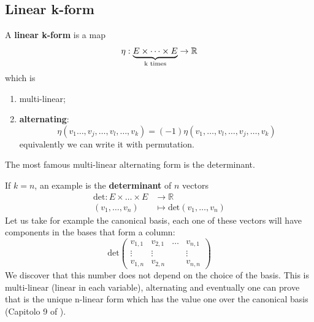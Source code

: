 \documentclass[../main.tex]{subfiles}
\begin{document}
\subsection{Linear k-form}
\begin{definition}
A \textbf{linear k-form} is a map
\[
\eta : \underbrace{E\times\dots\times E}_{\textrm{k times}} \to  \mathbb{R}\\
\]
which is
\begin{enumerate}
    \item multi-linear;
    \item \textbf{alternating}:
    \[
    \eta\left(v_1\dots,{v_j},\dots,{v_l},\dots,v_k\right)=(-1)\eta\left(v_1,\dots,{v_l},\dots,{v_j},\dots,v_k\right)
    \]
    equivalently we can write it with permutation.
\end{enumerate}
\end{definition}
The most famous multi-linear alternating form is the determinant.
\begin{example}
If $k=n$, an example is the \textbf{determinant} of $n$ vectors
\[
\begin{split}
\textrm{det} : E\times\dots\times E& \to  \mathbb{R}\\
(v_1,\dots,v_n) &\mapsto \textrm{det}(v_1,\dots,v_n)
\end{split}
\]
Let us take for example the canonical basis, each one of these vectors will have components in the bases that form a column:
\[
\textrm{det}
\begin{pmatrix}
v_{1,1} & v_{2,1} & \dots & v_{n,1}\\
\vdots & \vdots & & \vdots\\
v_{1,n} & v_{2,n} & & v_{n,n}
\end{pmatrix}
\]
We discover that this number does not depend on the choice of the basis. This is multi-linear (linear in each variable), alternating and eventually one can prove that is the unique n-linear form which has the value one over the canonical basis (Capitolo 9 of ).
\end{example}
\end{document}
